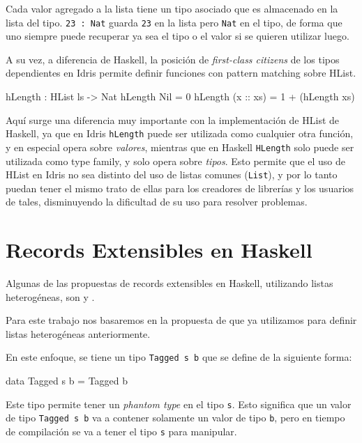 Cada valor agregado a la lista tiene un tipo asociado que es almacenado en la lista del tipo. \texttt{23 : Nat} guarda \texttt{23} en la lista pero \texttt{Nat} en el tipo, de forma que uno siempre puede recuperar ya sea el tipo o el valor si se quieren utilizar luego.

A su vez, a diferencia de Haskell, la posición de \textit{first-class citizens} de los tipos dependientes en Idris permite definir funciones con pattern matching sobre HList.

\begin{code}
hLength : HList ls -> Nat
hLength Nil = 0
hLength (x :: xs) = 1 + (hLength xs)
\end{code}

Aquí surge una diferencia muy importante con la implementación de HList de Haskell, ya que en Idris \texttt{hLength} puede ser utilizada como cualquier otra función, y en especial opera sobre \textit{valores}, mientras que en Haskell \texttt{HLength} solo puede ser utilizada como type family, y solo opera sobre \textit{tipos}.
Esto permite que el uso de HList en Idris no sea distinto del uso de listas comunes (\texttt{List}), y por lo tanto puedan tener el mismo trato de ellas para los creadores de librerías y los usuarios de tales, disminuyendo la dificultad de su uso para resolver problemas.

\section{Records Extensibles en Haskell}

Algunas de las propuestas de records extensibles en Haskell, utilizando listas heterogéneas, son \cite{Martinez:2013:JWC:2426890.2426908} y \cite{Kiselyov:2004:STH:1017472.1017488}.

Para este trabajo nos basaremos en la propuesta de \cite{Kiselyov:2004:STH:1017472.1017488} que ya utilizamos para definir listas heterogéneas anteriormente.

En este enfoque, se tiene un tipo \texttt{Tagged s b} que se define de la siguiente forma:

\begin{code}
data Tagged s b = Tagged b
\end{code}

Este tipo permite tener un \textit{phantom type} en el tipo \texttt{s}. Esto significa que un valor de tipo \texttt{Tagged s b} va a contener solamente un valor de tipo \texttt{b}, pero en tiempo de compilación se va a tener el tipo \texttt{s} para manipular.

